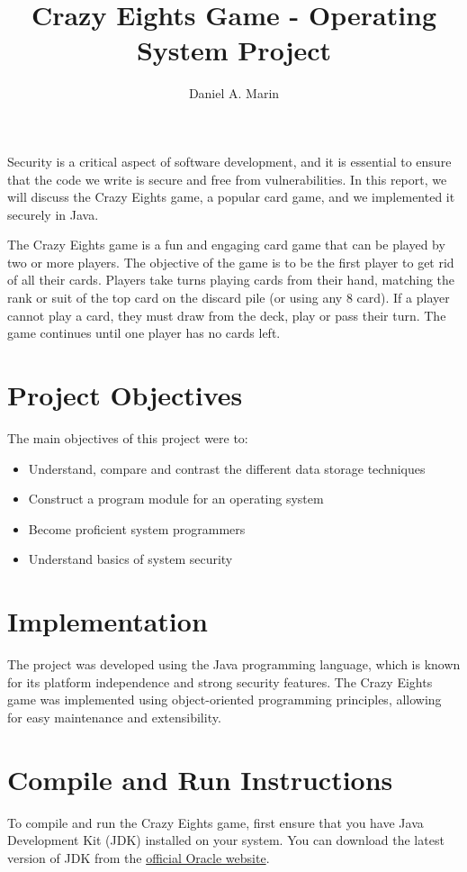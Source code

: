 \documentclass[conference]{IEEEtran}
\begin{document}
\title{Crazy Eights Game - Operating System Project}
\author{Daniel A. Marin}
\maketitle 

Security is a critical aspect of software development, and it is essential to ensure that the code we write is secure and free from vulnerabilities. In this report, we will discuss the Crazy Eights game, a popular card game, and we implemented it securely in Java. 

The Crazy Eights game is a fun and engaging card game that can be played by two or more players. The objective of the game is to be the first player to get rid of all their cards. Players take turns playing cards from their hand, matching the rank or suit of the top card on the discard pile (or using any $8$ card). If a player cannot play a card, they must draw from the deck, play or pass their turn. The game continues until one player has no cards left. 

\section{Project Objectives}
The main objectives of this project were to:
\begin{itemize}
    \item Understand, compare and contrast the different data storage techniques
    \item Construct a program module for an operating system
    \item Become proficient system programmers
    \item Understand basics of system security
\end{itemize}

\section{Implementation}
The project was developed using the Java programming language, which is known for its platform independence and strong security features. The Crazy Eights game was implemented using object-oriented programming principles, allowing for easy maintenance and extensibility.

\section{Compile and Run Instructions}
To compile and run the Crazy Eights game, first ensure that you have Java Development Kit (JDK) installed on your system. You can download the latest version of JDK from the \href{https://www.oracle.com/java/technologies/downloads/}{official Oracle website}. 
\end{document}
